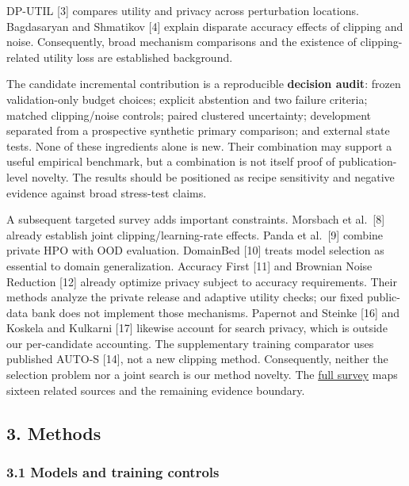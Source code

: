 \documentclass[
  10pt,
]{article}
\begin{document}
DP-UTIL {[}3{]} compares utility and privacy across perturbation
locations. Bagdasaryan and Shmatikov {[}4{]} explain disparate accuracy
effects of clipping and noise. Consequently, broad mechanism comparisons
and the existence of clipping-related utility loss are established
background.

The candidate incremental contribution is a reproducible
\textbf{decision audit}: frozen validation-only budget choices; explicit
abstention and two failure criteria; matched clipping/noise controls;
paired clustered uncertainty; development separated from a prospective
synthetic primary comparison; and external state tests. None of these
ingredients alone is new. Their combination may support a useful
empirical benchmark, but a combination is not itself proof of
publication-level novelty. The results should be positioned as recipe
sensitivity and negative evidence against broad stress-test claims.

A subsequent targeted survey adds important constraints. Morsbach et
al.~{[}8{]} already establish joint clipping/learning-rate effects.
Panda et al.~{[}9{]} combine private HPO with OOD evaluation. DomainBed
{[}10{]} treats model selection as essential to domain generalization.
Accuracy First {[}11{]} and Brownian Noise Reduction {[}12{]} already
optimize privacy subject to accuracy requirements. Their methods analyze
the private release and adaptive utility checks; our fixed public-data
bank does not implement those mechanisms. Papernot and Steinke {[}16{]}
and Koskela and Kulkarni {[}17{]} likewise account for search privacy,
which is outside our per-candidate accounting. The supplementary
training comparator uses published AUTO-S {[}14{]}, not a new clipping
method. Consequently, neither the selection problem nor a joint search
is our method novelty. The
\href{../docs/CONFIGURATION_SELECTION_LITERATURE.md}{full survey} maps
sixteen related sources and the remaining evidence boundary.

\hypertarget{methods}{%
\subsection{3. Methods}\label{methods}}

\hypertarget{models-and-training-controls}{%
\subsubsection{3.1 Models and training
controls}\label{models-and-training-controls}}
\end{document}
